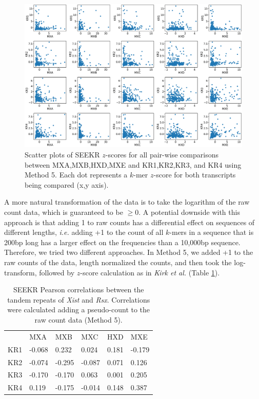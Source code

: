\begin{figure}[h]
\centering
\includegraphics[width=.9\textwidth]{images/7_figs.pdf}
\caption[Pseudo-count to raw $k$-mer counts]{Scatter plots of SEEKR $z$-scores for all pair-wise comparisons between MXA,MXB,HXD,MXE and KR1,KR2,KR3, and KR4 using Method 5. Each dot represents a $k$-mer $z$-score for both transcripts being compared (x,y axis).}
\label{fig:7plots}
\end{figure}

A more natural transformation of the data is to take the logarithm of the raw count data, which is guaranteed to be $\geq 0$. A potential downside with this approach is that adding 1 to raw counts has a differential effect on sequences of different lengths, \emph{i.e.} adding +1 to the count of all $k$-mers in a sequence that is 200bp long has a larger effect on the frequencies than a 10,000bp sequence. Therefore, we tried two different approaches. In Method 5, we added +1 to the raw counts of the data, length normalized the counts, and then took the log-transform, followed by $z$-score calculation as in \emph{Kirk et al.} (Table \ref{tbl:kmers5}).

\begin{table}[ht]
\begin{center}
\begin{tabular}{llllll}
&MXA & MXB                  & MXC                  & HXD                  & MXE                                         \\
KR1 & -0.068 & 0.232    & 0.024  & 0.181   & -0.179 \\
KR2 & -0.074 & -0.295 & -0.087 & 0.071  & 0.126  \\
KR3 & -0.170 & -0.170 & 0.063   & 0.001 & 0.205  \\
KR4 & 0.119  & -0.175  & -0.014 & 0.148   & 0.387
\end{tabular}
\caption[Pseudocount to raw $k$-mer counts $z$-score scatter plots]{SEEKR Pearson correlations between the tandem repeats of \emph{Xist} and \emph{Rsx}. Correlations were calculated adding a pseudo-count to the raw count data (Method 5).}
\label{tbl:kmers5}
\end{center}
\end{table}

